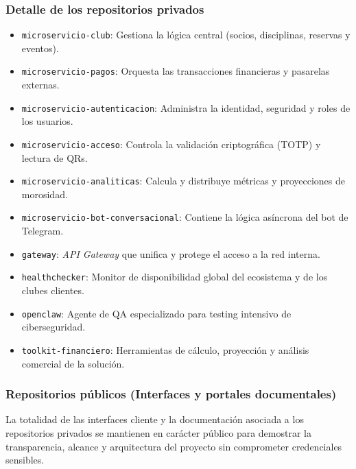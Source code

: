 \subsubsection*{Detalle de los repositorios privados}
\begin{itemize}
    \item \texttt{microservicio-club}: Gestiona la lógica central (socios, disciplinas, reservas y eventos).
    \item \texttt{microservicio-pagos}: Orquesta las transacciones financieras y pasarelas externas.
    \item \texttt{microservicio-autenticacion}: Administra la identidad, seguridad y roles de los usuarios.
    \item \texttt{microservicio-acceso}: Controla la validación criptográfica (TOTP) y lectura de QRs.
    \item \texttt{microservicio-analiticas}: Calcula y distribuye métricas y proyecciones de morosidad.
    \item \texttt{microservicio-bot-conversacional}: Contiene la lógica asíncrona del bot de Telegram.
    \item \texttt{gateway}: \textit{API Gateway} que unifica y protege el acceso a la red interna.
    \item \texttt{healthchecker}: Monitor de disponibilidad global del ecosistema y de los clubes clientes.
    \item \texttt{openclaw}: Agente de QA especializado para testing intensivo de ciberseguridad.
    \item \texttt{toolkit-financiero}: Herramientas de cálculo, proyección y análisis comercial de la solución.
\end{itemize}

\subsubsection{Repositorios públicos (Interfaces y portales documentales)}
La totalidad de las interfaces cliente y la documentación asociada a los repositorios privados se mantienen en carácter público para demostrar la transparencia, alcance y arquitectura del proyecto sin comprometer credenciales sensibles.

